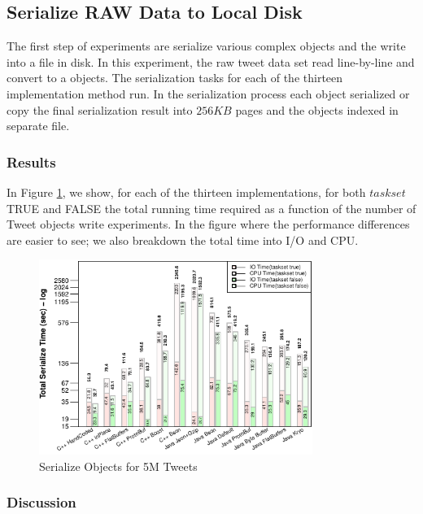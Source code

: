 \subsection{Serialize RAW Data to Local Disk}

The first step of experiments are serialize various complex objects and the write into a file in disk. In this experiment, the raw tweet data set read line-by-line and convert to a objects. The serialization tasks for each of the thirteen implementation method run. In the serialization process each object serialized or copy the final serialization result into $256KB$ pages and the objects indexed in separate file. 

\subsubsection{Results}

In Figure \ref{fig:exp_serialization_bar}, we show, for each of the thirteen implementations, for both $taskset$ TRUE and FALSE the total running time required as a function of the number of Tweet objects write experiments. In the figure where the
performance differences are easier to see; we also breakdown
the total time into I/O and CPU.
\begin{figure}
	\centering
	\includegraphics[width=\columnwidth,height=2.5in,keepaspectratio]{../../RScripts/Experiment_SerializeObjects_Bar.pdf}
	\caption{Serialize Objects for 5M Tweets}
	\label{fig:exp_serialization_bar}
\end{figure}

\subsubsection{Discussion}
